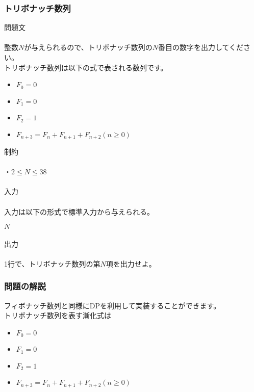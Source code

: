 \clearpage

\subsubsection{トリボナッチ数列}
\noindent
{\LARGE 問題文}\\ \hrulefill \\

\noindent
整数$N$が与えられるので、トリボナッチ数列の$N$番目の数字を出力してください。\\
トリボナッチ数列は以下の式で表される数列です。

\begin{itemize}
    \item $F_0 = 0$
    \item $F_1 = 0$
    \item $F_2 = 1$
    \item $F_{n+3} = F_{n} + F_{n+1}+ F_{n+2}(n \geq 0)$
\end{itemize}

\noindent
{\LARGE 制約}\\ \hrulefill \\

\noindent
・$2 \leq N \leq 38$
\\ \\
\noindent
{\LARGE 入力}\\ \hrulefill \\

\noindent
入力は以下の形式で標準入力から与えられる。 

\noindent
$N$
\\ \\
\noindent
{\LARGE 出力}\\ \hrulefill \\

\noindent
1行で、トリボナッチ数列の第$N$項を出力せよ。

\clearpage

\subsubsection{問題の解説}

\noindent
フィボナッチ数列と同様にDPを利用して実装することができます。\\
トリボナッチ数列を表す漸化式は

\begin{itemize}
    \item $F_0 = 0$
    \item $F_1 = 0$
    \item $F_2 = 1$
    \item $F_{n+3} = F_{n} + F_{n+1}+ F_{n+2}(n \geq 0)$
\end{itemize}


